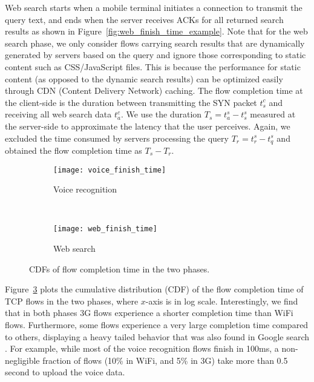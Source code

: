 Web search starts when a mobile terminal initiates a connection to transmit the query text, and ends when the server receives ACKs for all returned search results as shown in Figure~\ref{fig:web_finish_time_example}. Note that for the web search phase, we only consider flows carrying search results that are dynamically generated by servers based on the query and ignore those corresponding to static content such as CSS/JavaScript files. This is because the performance for static content (as opposed to the dynamic search results) can be optimized easily through CDN (Content Delivery Network) caching. The flow completion time at the client-side is the duration between transmitting the SYN packet $t^c_s$ and receiving all web search data $t^c_a$. We use the duration $T_s=t^s_a - t^s_s$ measured at the server-side to approximate the latency that the user perceives. Again, we excluded the time consumed by servers processing the query $T_r=t^s_r - t^s_q$ and obtained the flow completion time as $T_s-T_r$.

\begin{figure}[t]
\centering
\begin{subfigure}[b]{0.8\linewidth}
	\texttt{[image: voice\_finish\_time]}
\caption{Voice recognition}
\label{fig:voice_finish_time}
\end{subfigure} \\
\begin{subfigure}[b]{0.8\linewidth}
	\texttt{[image: web\_finish\_time]}
\caption{Web search}
\label{fig:web_finish_time}
\end{subfigure}
\caption{CDFs of flow completion time in the two phases.}
\label{fig:finish_time}
\end{figure}


Figure~\ref{fig:finish_time} plots the cumulative distribution (CDF) of the flow completion time of TCP flows in the two phases, where $x$-axis is in log scale. Interestingly, we find that in both phases 3G flows experience a shorter completion time than WiFi flows. Furthermore, some flows experience a very large completion time compared to others, displaying a heavy tailed behavior that was also found in Google search \cite{flach2013reducing}. For example, while most of the voice recognition flows finish in 100ms, a non-negligible fraction of flows (10\% in WiFi, and 5\% in 3G) take more than 0.5 second to upload the voice data. 


